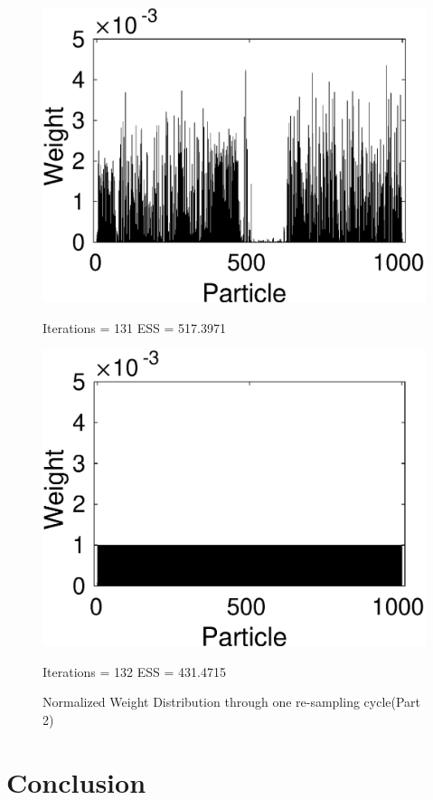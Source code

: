 \documentclass[12pt]{article}
\begin{document}
\begin{figure}[!t]
\begin{minipage}{0.5\textwidth}
		\includegraphics[scale = 0.4]{./Figures/131.eps}
		\caption*{Iterations = 131 ESS = 517.3971}
	\end{minipage}%
	\begin{minipage}{0.5\textwidth}
		\centering
		\includegraphics[scale = 0.4]{./Figures/132resampled.eps}
		\caption*{Iterations = 132 ESS = 431.4715}
	\end{minipage}
	\caption{Normalized Weight Distribution through one re-sampling cycle(Part 2)}
	\label{fig:DGweights2}
\end{figure}

\section{Conclusion}
\end{document}
